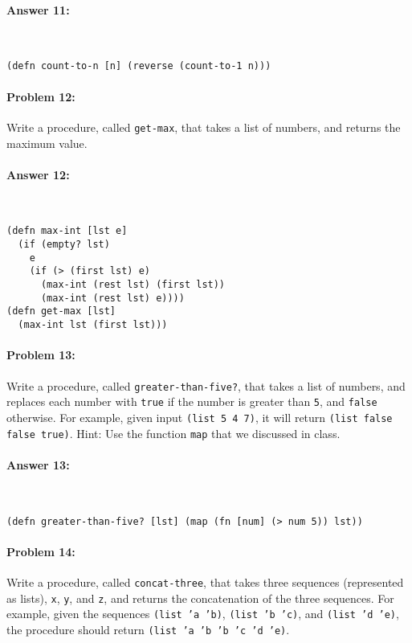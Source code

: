\documentclass[12pt, letterpaper]{article}
\begin{document}
\paragraph{Answer 11:}~\begin{lstlisting}
(defn count-to-n [n] (reverse (count-to-1 n)))
\end{lstlisting}

\hrulefill
\paragraph{Problem 12:}
  Write a procedure, called \texttt{get-max}, that takes a list of numbers, and
  returns the maximum value.

\paragraph{Answer 12:}~\begin{lstlisting}
(defn max-int [lst e]
  (if (empty? lst)
    e
    (if (> (first lst) e)
      (max-int (rest lst) (first lst))
      (max-int (rest lst) e))))
(defn get-max [lst]
  (max-int lst (first lst)))
\end{lstlisting}

\hrulefill
\paragraph{Problem 13:}
  Write a procedure, called \texttt{greater-than-five?}, that takes a
  list of numbers, and replaces each number with \texttt{true} if the
  number is greater than \texttt{5}, and \texttt{false} otherwise. For
  example, given input \texttt{(list 5 4 7)}, it will return
  \texttt{(list false false true)}. Hint: Use the function
  \texttt{map} that we discussed in class.

\paragraph{Answer 13:}~\begin{lstlisting}
(defn greater-than-five? [lst] (map (fn [num] (> num 5)) lst))
\end{lstlisting}

\hrulefill
\paragraph{Problem 14:}
Write a procedure, called \texttt{concat-three}, that takes three
sequences (represented as lists), \texttt{x}, \texttt{y}, and
\texttt{z}, and returns the concatenation of the three sequences. For
example, given the sequences \texttt{(list 'a 'b)}, \texttt{(list 'b
  'c)}, and \texttt{(list 'd 'e)}, the procedure should return
\texttt{(list 'a 'b 'b 'c 'd 'e)}.
\end{document}
